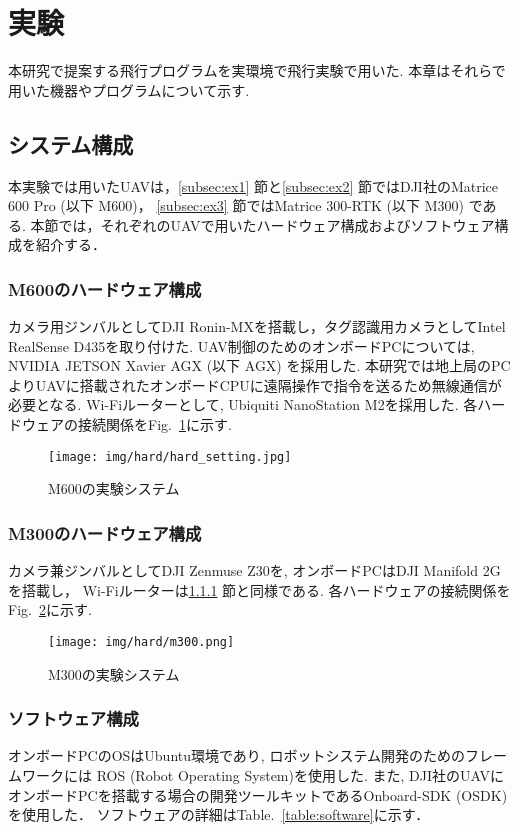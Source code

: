 \documentclass[a4j,fleqn,dvipdfmx,uplatex]{jsarticle}
\newcommand{\figref}[1]{Fig.\ \ref{#1}}
\newcommand{\tableref}[1]{Table.\ \ref{#1}}
\newcommand{\subsecref}[1]{\ref{#1}\hspace{0.2zw} 節}
\begin{document}
\section{実験}\label{sec3}
本研究で提案する飛行プログラムを実環境で飛行実験で用いた. 本章はそれらで用いた機器やプログラムについて示す. 

\subsection{システム構成}\label{subsec:hard}
本実験では用いたUAVは，\subsecref{subsec:ex1}と\subsecref{subsec:ex2}ではDJI社のMatrice 600 Pro (以下 M600)，
\subsecref{subsec:ex3}ではMatrice 300-RTK (以下 M300) である.
本節では，それぞれのUAVで用いたハードウェア構成およびソフトウェア構成を紹介する．

\subsubsection{M600のハードウェア構成}\label{subsubsec:m600}
カメラ用ジンバルとしてDJI Ronin-MXを搭載し，タグ認識用カメラとしてIntel RealSense D435を取り付けた. 
UAV制御のためのオンボードPCについては, NVIDIA JETSON Xavier AGX (以下 AGX) を採用した. 
本研究では地上局のPCよりUAVに搭載されたオンボードCPUに遠隔操作で指令を送るため無線通信が必要となる. 
Wi-Fiルーターとして, Ubiquiti NanoStation M2を採用した. 各ハードウェアの接続関係を\figref{fig:m600_setting}に示す. 

\begin{figure}[tb]
    \centering
        \texttt{[image: img/hard/hard\_setting.jpg]}
        \caption{M600の実験システム}
        \label{fig:m600_setting}
\end{figure}

\subsubsection{M300のハードウェア構成} 
カメラ兼ジンバルとしてDJI Zenmuse Z30を, オンボードPCはDJI Manifold 2Gを搭載し，
Wi-Fiルーターは\subsecref{subsubsec:m600}と同様である. 
各ハードウェアの接続関係を\figref{fig:m300_setting}に示す. 

\begin{figure}[tb]
    \centering
        \texttt{[image: img/hard/m300.png]}
        \caption{M300の実験システム}
        \label{fig:m300_setting}
\end{figure}

\subsubsection{ソフトウェア構成}
オンボードPCのOSはUbuntu環境であり, ロボットシステム開発のためのフレームワークには
ROS (Robot Operating System)\cite{ROS}を使用した. また, DJI社のUAVにオンボードPCを搭載する場合の開発ツールキットであるOnboard-SDK (OSDK)\cite{OSDK} を使用した．
ソフトウェアの詳細は\tableref{table:software}に示す．
\end{document}

